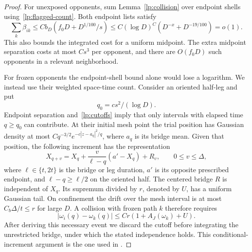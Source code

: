 \begin{proof}
For unexposed opponents, sum Lemma~\ref{lp:collision} over endpoint
shells using~\eqref{lp:flagged-count}.  Both endpoint lists satisfy
\[
 \sum_k\beta_{ik}
 \leq C b_D(f_0D+D^{1/100}/s)
 \leq C(\log D)^C(D^{-x}+D^{-19/100})=o(1).
\]
This also bounds the integrated cost for a uniform midpoint.  The
extra midpoint separation costs at most $Cs^3$ per opponent, and
there are $O(f_0D)$ such opponents in a relevant neighborhood.

For frozen opponents the endpoint-shell bound alone would lose a
logarithm.  We instead use their weighted space-time count.  Consider
an oriented half-leg and put
\[
 q_0=cs^2/(\log D).
\]
Endpoint separation and~\eqref{lp:cutoffs} imply that only intervals
with elapsed time $q\geq q_0$ can contribute.  At their initial mesh
point the trial position has Gaussian density at most
$Cq^{-3/2}e^{-c|z-a_q|^2/q}$, where $a_q$ is its bridge mean.
Given that position, the following increment has the representation
\[
 X_{q+v}=X_q+\frac{v}{\ell-q}(a'-X_q)+R_v,
 \qquad 0\leq v\leq\Delta,
\]
where $\ell\in\{t,2t\}$ is the bridge or leg duration, $a'$ is its
opposite prescribed endpoint, and $\ell-q\geq\ell/2$ on the oriented
half.  The centered bridge $R$ is independent of $X_q$.  Its supremum
divided by $r$, denoted by $U$, has a uniform Gaussian tail.
On confinement the drift
over the mesh interval is at most $C_b\Delta/t\leq r$ for large $D$.
A collision with frozen path $k$ therefore requires
\begin{equation}\label{lp:mesh-collision}
 |\omega_i(q)-\omega_k(q)|
 \leq Cr(1+A_J(\omega_k)+U).
\end{equation}
After deriving this necessary event we discard the cutoff before
integrating the unrestricted bridge, under which the stated independence
holds.  This conditional-increment argument is the one used in
\cite[Proposition~5.2]{H}.


\end{proof}
